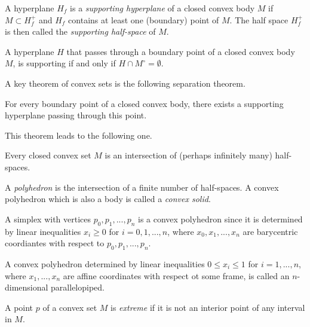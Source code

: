 \documentclass{article}
\begin{document}
    \begin{definition}
      A hyperplane $H_f$ is a \textit{supporting hyperplane} of a closed convex body $M$ if $M \subset H^+_f$ and $H_f$ contains at least one (boundary) point of $M$. The half space $H^+_f$ is then called the \textit{supporting half-space} of $M$. 
    \end{definition}

    \begin{proposition}
      A hyperplane $H$ that passes through a boundary point of a closed convex body $M$, is supporting if and only if $H \cap M^\circ = \emptyset$. 
    \end{proposition}

    A key theorem of convex sets is the following separation theorem. 

    \begin{theorem}
      For every boundary point of a closed convex body, there exists a supporting hyperplane passing through this point. 
    \end{theorem}

    This theorem leads to the following one. 

    \begin{theorem}
      Every closed convex set $M$ is an intersection of (perhaps infinitely many) half-spaces. 
    \end{theorem}

    \begin{definition}
      A \textit{polyhedron} is the intersection of a finite number of half-spaces. A convex polyhedron which is also a body is called a \textit{convex solid}. 
    \end{definition}

    \begin{example}
      A simplex with vertices $p_0, p_1, ..., p_n$ is a convex polyhedron since it is determined by linear inequalities $x_i \geq 0$ for $i = 0, 1, ..., n$, where $x_0, x_1, ..., x_n$ are barycentric coordiantes with respect to $p_0, p_1,..., p_n$. 
    \end{example}

    \begin{example}
      A convex polyhedron determined by linear inequalities $0 \leq x_i \leq 1$ for $i = 1, ..., n$, where $x_1,..., x_n$ are affine coordinates with respect ot some frame, is called an $n$-dimensional parallelopiped. 
    \end{example}

    \begin{definition}
      A point $p$ of a convex set $M$ is \textit{extreme} if it is not an interior point of any interval in $M$. 
    \end{definition}
\end{document}
